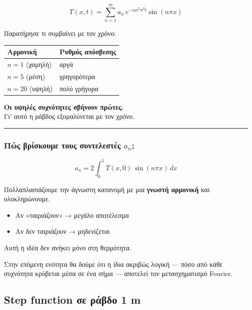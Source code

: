 \documentclass[a4paper, 11pt]{article}
\providecommand{\tightlist}{\setlength{\itemsep}{0pt}\setlength{\parskip}{0pt}}
\begin{document}
\[T(x, t) = \sum_{n=1}^{\infty} a_n \, e^{-\alpha n^2 \pi^2 t} \sin(n\pi x)\]

Παρατήρησε τι συμβαίνει με τον χρόνο:

\begin{longtable}[]{@{}ll@{}}
\toprule\noalign{}
Αρμονική & Ρυθμός απόσβεσης \\
\midrule\noalign{}
\endhead
\bottomrule\noalign{}
\endlastfoot
\(n=1\) (χαμηλή) & αργά \\
\(n=5\) (μέση) & γρηγορότερα \\
\(n=20\) (υψηλή) & πολύ γρήγορα \\
\end{longtable}

\textbf{Οι υψηλές συχνότητες σβήνουν πρώτες.}\\
Γι' αυτό η ράβδος εξομαλύνεται με τον χρόνο.

\begin{center}\rule{0.5\linewidth}{0.5pt}\end{center}

\subsubsection{\texorpdfstring{Πώς βρίσκουμε τους συντελεστές
\(a_n\);}{Πώς βρίσκουμε τους συντελεστές a\_n;}}\label{ux3c0ux3ceux3c2-ux3b2ux3c1ux3afux3c3ux3baux3bfux3c5ux3bcux3b5-ux3c4ux3bfux3c5ux3c2-ux3c3ux3c5ux3bdux3c4ux3b5ux3bbux3b5ux3c3ux3c4ux3adux3c2-a_n}

\[a_n = 2\int_0^1 T(x,0)\,\sin(n\pi x)\,dx\]

Πολλαπλασιάζουμε την άγνωστη κατανομή με μια \textbf{γνωστή αρμονική}
και ολοκληρώνουμε.

\begin{itemize}
\tightlist
\item
  Αν «ταιριάζουν» → μεγάλο αποτέλεσμα
\item
  Αν δεν ταιριάζουν → μηδενίζεται
\end{itemize}

Αυτή η ιδέα δεν ανήκει μόνο στη θερμότητα.

Στην επόμενη ενότητα θα δούμε ότι η ίδια ακριβώς λογική --- πόσο από
κάθε συχνότητα κρύβεται μέσα σε ένα σήμα --- αποτελεί τον μετασχηματισμό
Fourier.

\subsection{Step function σε ράβδο 1
m}\label{step-function-ux3c3ux3b5-ux3c1ux3acux3b2ux3b4ux3bf-1-m}
\end{document}
